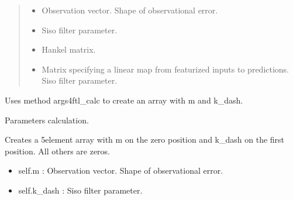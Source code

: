\documentclass[letterpaper,10pt,english]{sphinxmanual}
\begin{document}
\begin{fulllineitems}
\begin{quote}
\begin{description}
\begin{itemize}
\item {} 
\sphinxAtStartPar
{} \textendash{} Observation vector. Shape of observational error.

\item {} 
\sphinxAtStartPar
{} \textendash{} Siso filter parameter.

\item {} 
\sphinxAtStartPar
{} \textendash{} Hankel matrix.

\item {} 
\sphinxAtStartPar
{} \textendash{} Matrix specifying a linear map from featurized inputs to predictions.
Siso filter parameter.

\end{itemize}

\end{description}\end{quote}

\sphinxAtStartPar
Uses method args4ftl\_calc to create an array with m and k\_dash.

\begin{fulllineitems}
\label{\detokenize{LDS.LDS.filters:LDS.LDS.filters.wave_filtering_siso_ftl.WaveFilteringSisoFtl.args4ftl_calc}}
\sphinxAtStartPar
Parameters calculation.

\sphinxAtStartPar
Creates a 5\sphinxhyphen{}element array with m
on the zero position and k\_dash on the first position.
All others are zeros.
\begin{itemize}
\item {} 
\sphinxAtStartPar
self.m      : Observation vector. Shape of observational error.

\item {} 
\sphinxAtStartPar
self.k\_dash : Siso filter parameter.

\end{itemize}

\end{fulllineitems}



\end{fulllineitems}
\end{document}
